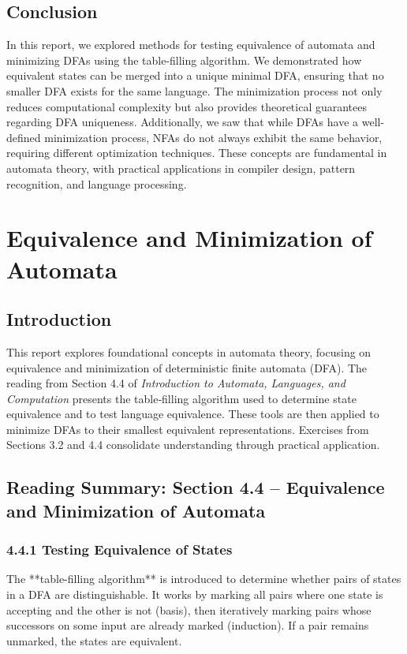 \documentclass{article}
\begin{document}

\subsection{Conclusion}
In this report, we explored methods for testing equivalence of automata and minimizing DFAs using the table-filling algorithm. We demonstrated how equivalent states can be merged into a unique minimal DFA, ensuring that no smaller DFA exists for the same language. The minimization process not only reduces computational complexity but also provides theoretical guarantees regarding DFA uniqueness. Additionally, we saw that while DFAs have a well-defined minimization process, NFAs do not always exhibit the same behavior, requiring different optimization techniques. These concepts are fundamental in automata theory, with practical applications in compiler design, pattern recognition, and language processing.

\section{Equivalence and Minimization of Automata}

\subsection{Introduction}
This report explores foundational concepts in automata theory, focusing on equivalence and minimization of deterministic finite automata (DFA). The reading from Section 4.4 of \emph{Introduction to Automata, Languages, and Computation} presents the table‐filling algorithm used to determine state equivalence and to test language equivalence. These tools are then applied to minimize DFAs to their smallest equivalent representations. Exercises from Sections 3.2 and 4.4 consolidate understanding through practical application.

\subsection{Reading Summary: Section 4.4 – Equivalence and Minimization of Automata}

\subsubsection*{4.4.1 Testing Equivalence of States}
The **table-filling algorithm** is introduced to determine whether pairs of states in a DFA are distinguishable. It works by marking all pairs where one state is accepting and the other is not (basis), then iteratively marking pairs whose successors on some input are already marked (induction). If a pair remains unmarked, the states are equivalent.
\end{document}
